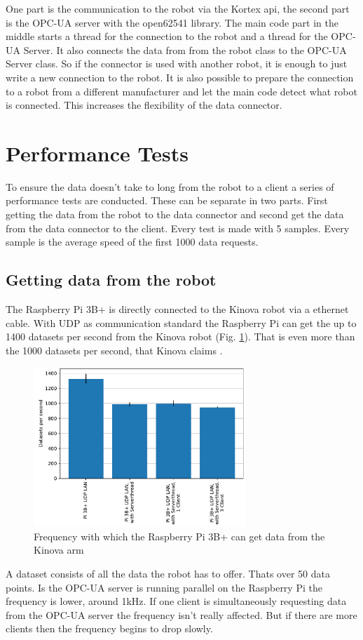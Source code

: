 \documentclass[conference]{IEEEtran}
\begin{document}
One part is the communication to the robot via the Kortex api, the second part is the OPC-UA server with the open62541 library.
The main code part in the middle  starts a thread for the connection to the robot and a thread for the OPC-UA Server.
It also connects the data from from the robot class to the OPC-UA Server class.
So if the connector is used with another robot, it is enough to just write a new connection to the robot.
It is also possible to prepare the connection to a robot from a different manufacturer and let the main code detect what robot is connected.
This increases the flexibility of the data connector. 

\section{Performance Tests}
To ensure the data doesn't take to long from the robot to a client a series of performance tests are conducted.
These can be separate in two parts. 
First getting the data from the robot to the data connector and second get the data from the data connector to the client.
Every test is made with 5 samples. Every sample is the average speed of the first 1000 data requests.
\subsection{Getting data from the robot}
The Raspberry Pi 3B+ is directly connected to the Kinova robot via a ethernet cable.
With UDP as communication standard the Raspberry Pi can get the up to 1400 datasets per second from the Kinova robot (Fig. \ref{fig:KortexAPISpeed}).
That is even more than the 1000 datasets per second, that Kinova claims \cite{KortexUDP}.
\begin{figure}[htbp]
    \centerline{\includegraphics[width=8cm]{Pictures/KortexAPISpeed.pdf}}
    \caption{Frequency with which the Raspberry Pi 3B+ can get data from the Kinova arm}
    \label{fig:KortexAPISpeed}
\end{figure}
A dataset consists of all the data the robot has to offer. Thats over 50 data points.
Is the OPC-UA server is running parallel on the Raspberry Pi the frequency is lower, around 1kHz.
If one client is simultaneously requesting data from the OPC-UA server the frequency isn't really affected.
But if there are more clients then the frequency begins to drop slowly.
\end{document}
